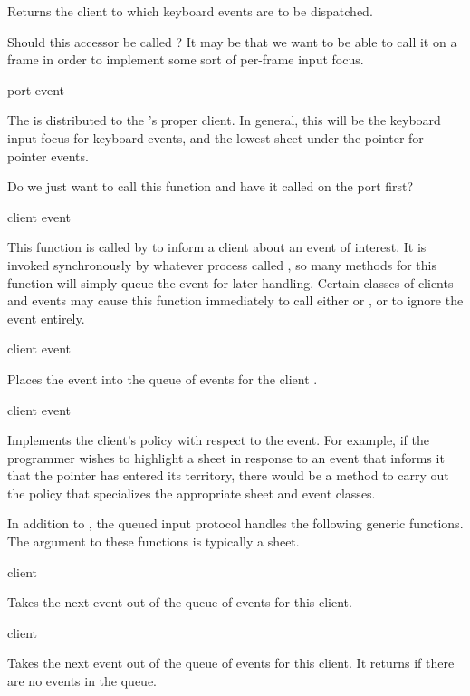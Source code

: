 Returns the client to which keyboard events are to be dispatched.

 {Should this accessor be called ?  It may
be that we want to be able to call it on a frame in order to implement some sort
of per-frame input focus.}

 {port event}

The  is distributed to the 's proper client.  In general,
this will be the keyboard input focus for keyboard events, and the lowest sheet
under the pointer for pointer events.

 {Do we just want to call this function  and have
it called on the port first?}

 {client event}

This function is called by  to inform a client about an
event of interest.  It is invoked synchronously by whatever process called
, so many methods for this function will simply queue the
event for later handling.  Certain classes of clients and events may cause this
function immediately to call either  or , or to
ignore the event entirely.

 {client event}

Places the event  into the queue of events for the client .

 {client event}

Implements the client's policy with respect to the event.  For example, if the
programmer wishes to highlight a sheet in response to an event that informs it
that the pointer has entered its territory, there would be a method to carry out
the policy that specializes the appropriate sheet and event classes.

In addition to , the queued input protocol handles the following
generic functions.  The  argument to these functions is typically a
sheet.

 {client}

Takes the next event out of the queue of events for this client.

 {client}

Takes the next event out of the queue of events for this client.  It returns
 if there are no events in the queue.

